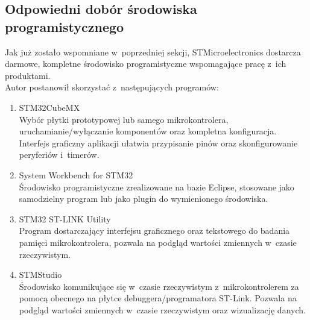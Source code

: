 \subsection{Odpowiedni dobór środowiska programistycznego}
\label{sec:IDE}
Jak już zostało wspomniane w~poprzedniej sekcji, STMicroelectronics dostarcza darmowe, kompletne środowisko programistyczne wspomagające pracę z~ich produktami.\\
Autor postanowił skorzystać z~następujących programów:
\begin{enumerate}
	\item STM32CubeMX\\ 
	Wybór płytki prototypowej lub samego mikrokontrolera, uruchamianie/wyłączanie komponentów oraz kompletna konfiguracja. Interfejs graficzny aplikacji ułatwia przypisanie pinów oraz skonfigurowanie peryferiów i~timerów.
	\item System Workbench for STM32\\
	Środowisko programistyczne zrealizowane na bazie Eclipse, stosowane jako samodzielny program lub jako plugin do wymienionego środowiska.
	\item STM32 ST-LINK Utility\\
	Program dostarczający interfejsu graficznego oraz tekstowego do badania pamięci mikrokontrolera, pozwala na podgląd wartości zmiennych w~czasie rzeczywistym. %
	\item STMStudio\\
	Środowisko komunikujące się w~czasie rzeczywistym z~mikrokontrolerem za pomocą obecnego na płytce debuggera/programatora ST-Link. Pozwala na podgląd wartości zmiennych w~czasie rzeczywistym oraz wizualizację danych. %
\end{enumerate}	